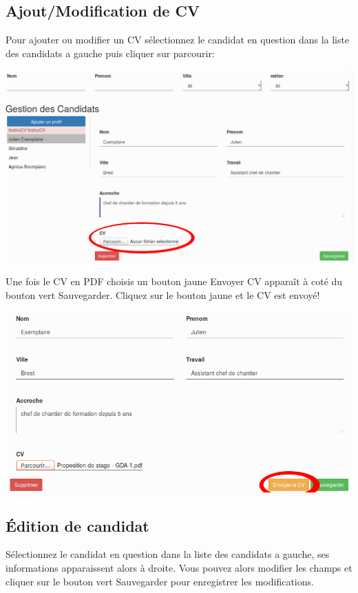 \documentclass[a4paper, 12pt]{report}
\begin{document}
\subsection{Ajout/Modification de CV}
Pour ajouter ou modifier un CV sélectionnez le candidat en question dans la liste des candidats a gauche puis cliquer sur parcourir:
\begin{center}
\includegraphics[width=16cm]{candidatsselectCV.png}
\end{center}
Une fois le CV en PDF choisis un bouton jaune Envoyer CV apparaît à coté du bouton vert Sauvegarder. Cliquez sur le bouton jaune et le CV est envoyé!
\begin{center}
\includegraphics[width=16cm]{candidatssendCV.png}
\end{center}
\subsection{Édition de candidat}
Sélectionnez le candidat en question dans la liste des candidats a gauche, ses informations apparaissent alors à droite. Vous pouvez alors modifier les champs et cliquer sur le bouton vert Sauvegarder pour enregistrer les modifications.
\end{document}
